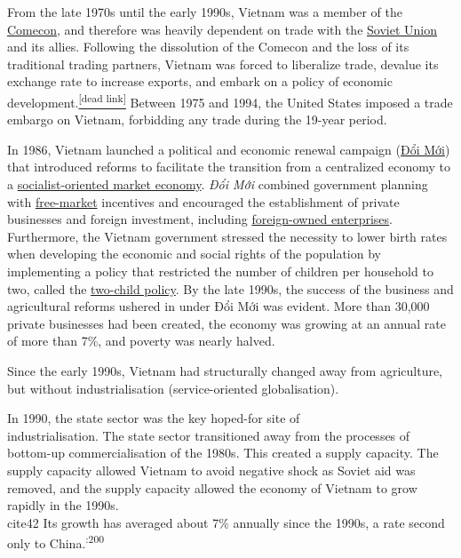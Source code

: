 \documentclass[openany]{book}
\begin{document}
From the late 1970s until the early 1990s, Vietnam was a member of the \href{https://en.wikipedia.org/wiki/Comecon}{Comecon}, and therefore was heavily dependent on trade with the \href{https://en.wikipedia.org/wiki/Soviet_Union}{Soviet Union} and its allies. Following the dissolution of the Comecon and the loss of its traditional trading partners, Vietnam was forced to liberalize trade, devalue its exchange rate to increase exports, and embark on a policy of economic development.\cite{36}\href{https://en.wikipedia.org/wiki/Wikipedia:Link_rot}{\textsuperscript{[dead link]}}  Between 1975 and 1994, the United States imposed a trade embargo on Vietnam, forbidding any trade during the 19-year period.

In 1986, Vietnam launched a political and economic renewal campaign (\href{https://en.wikipedia.org/wiki/%C4%90%E1%BB%95i_M%E1%BB%9Bi}{Đổi Mới}) that introduced reforms to facilitate the transition from a centralized economy to a \href{https://en.wikipedia.org/wiki/Socialist-oriented_market_economy}{socialist-oriented market economy}. \textit{Đổi Mới} combined government planning with \href{https://en.wikipedia.org/wiki/Free-market}{free-market} incentives and encouraged the establishment of private businesses and foreign investment, including \href{https://en.wikipedia.org/wiki/Foreign_direct_investment}{foreign-owned enterprises}. Furthermore, the Vietnam government stressed the necessity to lower birth rates when developing the economic and social rights of the population by implementing a policy that restricted the number of children per household to two, called the \href{https://en.wikipedia.org/wiki/Two-child_policy}{two-child policy}.\cite{41} By the late 1990s, the success of the business and agricultural reforms ushered in under Đổi Mới was evident. More than 30,000 private businesses had been created, the economy was growing at an annual rate of more than 7\%, and poverty was nearly halved.\cite{36}

Since the early 1990s, Vietnam had structurally changed away from agriculture, but without industrialisation (service-oriented globalisation).\cite{42}

In 1990, the state sector was the key hoped-for site of \\industrialisation.\cite{42} The state sector transitioned away from the processes of bottom-up commercialisation of the 1980s.\cite{42} This created a supply capacity. The supply capacity allowed Vietnam to avoid negative shock as Soviet aid was removed,\cite{42} and the supply capacity allowed the economy of Vietnam to grow rapidly in the 1990s.\\cite{42} Its growth has averaged about 7\% annually since the 1990s, a rate second only to China.\cite{43}\textsuperscript{:200}
\end{document}
